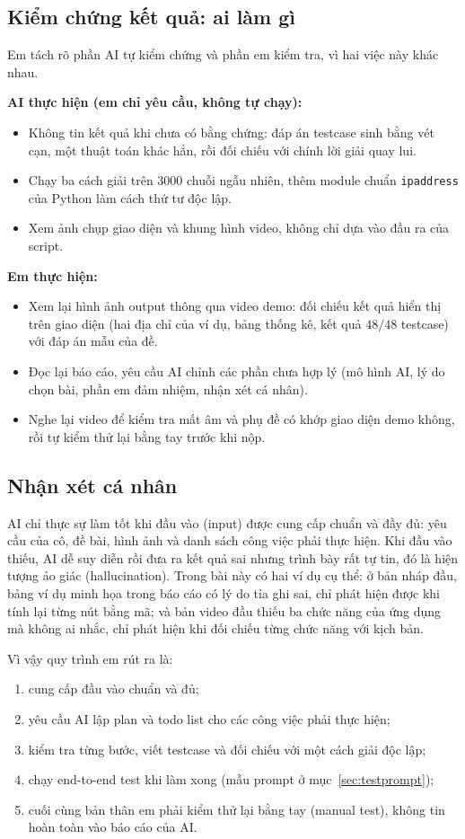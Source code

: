 \documentclass[12pt,a4paper]{article}
\begin{document}
\subsection{Kiểm chứng kết quả: ai làm gì}
Em tách rõ phần AI tự kiểm chứng và phần em kiểm tra, vì hai việc này khác nhau.

\textbf{AI thực hiện (em chỉ yêu cầu, không tự chạy):}
\begin{itemize}
    \item Không tin kết quả khi chưa có bằng chứng: đáp án testcase sinh bằng vét cạn, một thuật toán khác hẳn, rồi đối chiếu với chính lời giải quay lui.
    \item Chạy ba cách giải trên $3000$ chuỗi ngẫu nhiên, thêm module chuẩn \texttt{ipaddress} của Python làm cách thứ tư độc lập.
    \item Xem ảnh chụp giao diện và khung hình video, không chỉ dựa vào đầu ra của script.
\end{itemize}

\textbf{Em thực hiện:}
\begin{itemize}
    \item Xem lại hình ảnh output thông qua video demo: đối chiếu kết quả hiển thị trên giao diện (hai địa chỉ của ví dụ, bảng thống kê, kết quả $48/48$ testcase) với đáp án mẫu của đề.
    \item Đọc lại báo cáo, yêu cầu AI chỉnh các phần chưa hợp lý (mô hình AI, lý do chọn bài, phần em đảm nhiệm, nhận xét cá nhân).
    \item Nghe lại video để kiểm tra mất âm và phụ đề có khớp giao diện demo không, rồi tự kiểm thử lại bằng tay trước khi nộp.
\end{itemize}

\subsection{Nhận xét cá nhân}
AI chỉ thực sự làm tốt khi đầu vào (input) được cung cấp chuẩn và đầy đủ: yêu cầu của cô, đề bài, hình ảnh và danh sách công việc phải thực hiện. Khi đầu vào thiếu, AI dễ suy diễn rồi đưa ra kết quả sai nhưng trình bày rất tự tin, đó là hiện tượng ảo giác (hallucination). Trong bài này có hai ví dụ cụ thể: ở bản nháp đầu, bảng ví dụ minh họa trong báo cáo có lý do tỉa ghi sai, chỉ phát hiện được khi tính lại từng nút bằng mã; và bản video đầu thiếu ba chức năng của ứng dụng mà không ai nhắc, chỉ phát hiện khi đối chiếu từng chức năng với kịch bản.

Vì vậy quy trình em rút ra là:
\begin{enumerate}
    \item cung cấp đầu vào chuẩn và đủ;
    \item yêu cầu AI lập plan và todo list cho các công việc phải thực hiện;
    \item kiểm tra từng bước, viết testcase và đối chiếu với một cách giải độc lập;
    \item chạy end-to-end test khi làm xong (mẫu prompt ở mục~\ref{sec:testprompt});
    \item cuối cùng bản thân em phải kiểm thử lại bằng tay (manual test), không tin hoàn toàn vào báo cáo của AI.
\end{enumerate}
\end{document}
